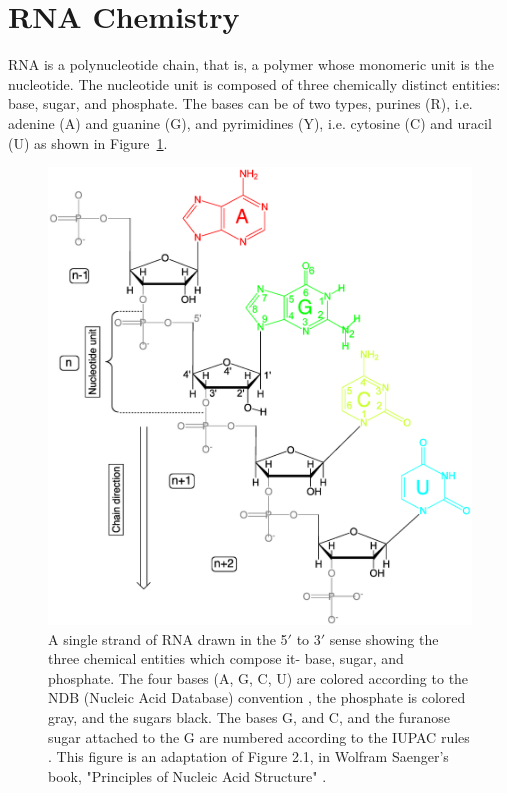 \section{RNA Chemistry}
\label{sec:rnachem}
RNA is  a polynucleotide  chain, that is,  a polymer  whose monomeric
unit  is the  nucleotide.  The  nucleotide unit  is composed  of three
chemically distinct  entities: base,  sugar, and phosphate.  The bases
can be  of two types, purines  (R), i.e. adenine (A)  and guanine (G),
and  pyrimidines (Y), i.e.  cytosine (C)  and uracil  (U) as  shown in
Figure~\ref{fig:chemistry1}.
\begin{figure}
\centering
\includegraphics[scale=0.8]{Chapter1/chemistry1b.png}
\caption{A  single strand  of  RNA drawn  in  the 5$'$  to 3$'$  sense
  showing the  three chemical entities which compose  it- base, sugar,
  and phosphate.  The four bases (A, G, C, U) are colored according to
  the  NDB  (Nucleic  Acid  Database)  convention  \cite{ndburl},  the
  phosphate is colored gray, and the sugars black. The bases G, and C,
  and the furanose  sugar attached to the G  are numbered according to
  the IUPAC  rules \cite{iupac1983}. This  figure is an  adaptation of
  Figure 2.1,  in Wolfram Saenger's book, "Principles  of Nucleic Acid
  Structure" \cite{saenger1984}.}
\label{fig:chemistry1}
\end{figure}

